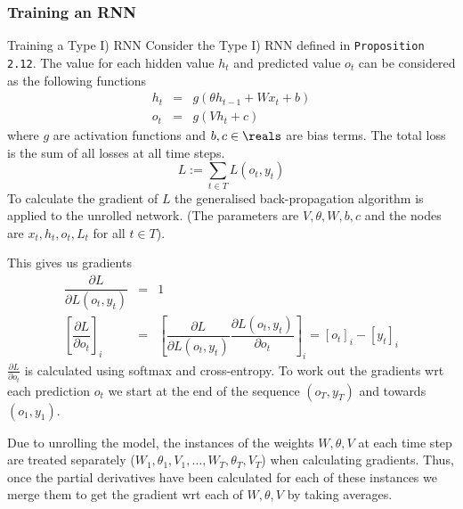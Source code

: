 \documentclass[11pt,a4paper]{article}
\begin{document}
  \subsubsection*{Training an RNN}

  \begin{proposition}{Training a Type I) RNN}
    Consider the Type I) RNN defined in \texttt{Proposition 2.12}. The value for each hidden value $h_t$ and predicted value $o_t$ can be considered as the following functions
    \[\begin{array}{rcl}
      h_t&=&g(\theta h_{t-1}+W x_t+b)\\
      o_t&=&g(Vh_t+c)
    \end{array}\]
    where $g$ are activation functions and $b,c\in\reals$ are bias terms. The total loss is the sum of all losses at all time steps.
    \[ L:=\sum_{t\in T}L(o_t,y_t) \]
    To calculate the gradient of $L$ the generalised back-propagation algorithm is applied to the unrolled network. (The parameters are $V,\theta,W,b,c$ and the nodes are $x_t,h_t,o_t,L_t$ for all $t\in T$).
    \par This gives us gradients
    \[\begin{array}{rcl}
      \dfrac{\partial L}{\partial L(o_t,y_t)}&=&1\\
      \left[\dfrac{\partial L}{\partial o_t}\right]_i&=&\left[\dfrac{\partial L}{\partial L(o_t,y_t)}\dfrac{\partial L(o_t,y_t)}{\partial o_t}\right]_i=[o_t]_i-[y_t]_i
    \end{array}\]
    $\frac{\partial L}{\partial o_t}$ is calculated using softmax and cross-entropy. To work out the gradients wrt each prediction $o_t$ we start at the end of the sequence $(o_T,y_T)$ and towards $(o_1,y_1)$.
    \par Due to unrolling the model, the instances of the weights $W,\theta,V$ at each time step are treated separately ($W_1,\theta_1,V_1,\dots,W_T,\theta_T,V_T$) when calculating gradients. Thus, once the partial derivatives have been calculated for each of these instances we merge them to get the gradient wrt each of $W,\theta,V$ by taking averages.
  \end{proposition}
\end{document}
